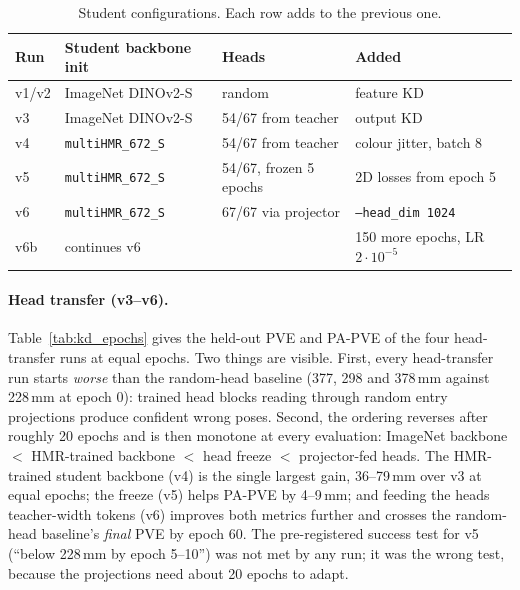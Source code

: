 \begin{table}[h]
\centering\small
\begin{tabular}{llll}
\toprule
Run & Student backbone init & Heads & Added \\
\midrule
v1/v2 & ImageNet DINOv2-S & random & feature KD \\
v3 & ImageNet DINOv2-S & 54/67 from teacher & output KD \\
v4 & \texttt{multiHMR\_672\_S} & 54/67 from teacher & colour jitter, batch 8 \\
v5 & \texttt{multiHMR\_672\_S} & 54/67, frozen 5 epochs & 2D losses from epoch 5 \\
v6 & \texttt{multiHMR\_672\_S} & 67/67 via projector & \texttt{--head\_dim 1024} \\
v6b & continues v6 & & 150 more epochs, LR $2{\cdot}10^{-5}$ \\
\bottomrule
\end{tabular}
\caption{Student configurations. Each row adds to the previous one.}
\label{tab:student_runs}
\end{table}

\paragraph{Head transfer (v3--v6).} Table~\ref{tab:kd_epochs} gives the
held-out PVE and PA-PVE of the four head-transfer runs at equal epochs. Two
things are visible. First, every head-transfer run starts \emph{worse} than
the random-head baseline (377, 298 and 378\,mm against 228\,mm at epoch 0):
trained head blocks reading through random entry projections produce
confident wrong poses. Second, the ordering reverses after roughly 20 epochs
and is then monotone at every evaluation: ImageNet backbone $<$ HMR-trained
backbone $<$ head freeze $<$ projector-fed heads. The HMR-trained student
backbone (v4) is the single largest gain, 36--79\,mm over v3 at equal epochs;
the freeze (v5) helps PA-PVE by 4--9\,mm; and feeding the heads teacher-width
tokens (v6) improves both metrics further and crosses the random-head
baseline's \emph{final} PVE by epoch 60. The pre-registered success test for
v5 (``below 228\,mm by epoch 5--10'') was not met by any run; it was the wrong
test, because the projections need about 20 epochs to adapt.

